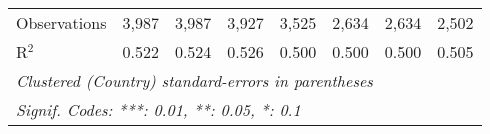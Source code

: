 \begin{table}[htbp]
\begin{tabular}{lccccccc}
      Observations                                                      & 3,987          & 3,987         & 3,927        & 3,525       & 2,634   & 2,634   & 2,502\\  
      R$^2$                                                             & 0.522          & 0.524         & 0.526        & 0.500       & 0.500   & 0.500   & 0.505\\  
      \midrule
      \multicolumn{8}{l}{\emph{Clustered (Country) standard-errors in parentheses}}\\
      \multicolumn{8}{l}{\emph{Signif. Codes: ***: 0.01, **: 0.05, *: 0.1}}\\
   \end{tabular}
\end{table}


